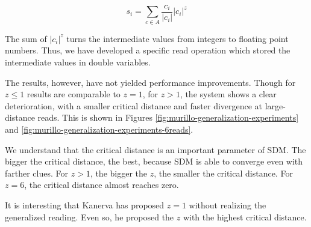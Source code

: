$$
s_i = \sum_{c \in A} \frac{c_i}{|c_i|} |c_i|^z
$$

The sum of $|c_i|^z$ turns the intermediate values from integers to floating point numbers. Thus, we have developed a specific read operation which stored the intermediate values in double variables.

The results, however, have not yielded performance improvements. Though for $z \leq 1$ results are comparable to $z=1$, for $z>1$, the system shows a clear deterioration, with a smaller critical distance and faster divergence at large-distance reads. This is shown in Figures \ref{fig:murillo-generalization-experiments} and \ref{fig:murillo-generalization-experiments-6reads}.

We understand that the critical distance is an important parameter of SDM. The bigger the critical distance, the best, because SDM is able to converge even with farther clues. For $z>1$, the bigger the $z$, the smaller the critical distance. For $z = 6$, the critical distance almost reaches zero.

It is interesting that Kanerva has proposed $z=1$ without realizing the generalized reading. Even so, he proposed the $z$ with the highest critical distance.

